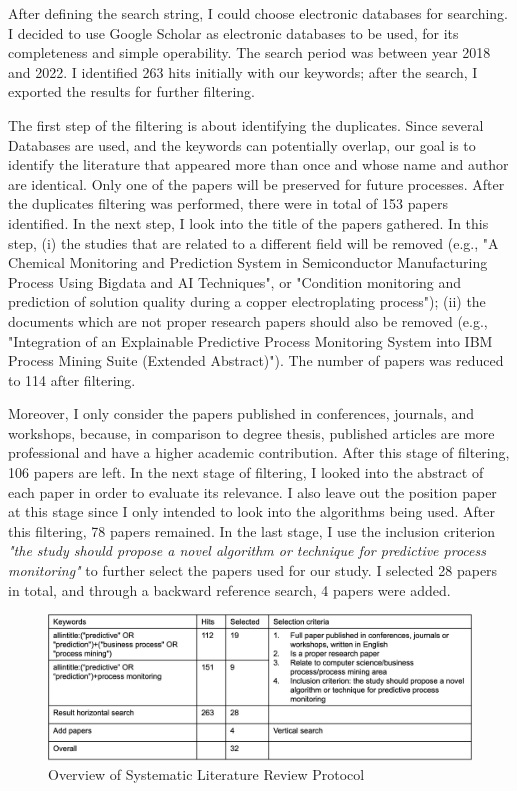 \documentclass[runningheads]{llncs}
\begin{document}
		After defining the search string, I could choose electronic databases for searching. I decided to use Google Scholar as electronic databases to be used, for its completeness and simple operability. The search period was between year 2018 and 2022. I identified 263 hits initially with our keywords; after the search, I exported the results for further filtering.
		
		The first step of the filtering is about identifying the duplicates. Since several Databases are used, and the keywords can potentially overlap, our goal is to identify the literature that appeared more than once and whose name and author are identical. Only one of the papers will be preserved for future processes. After the duplicates filtering was performed, there were in total of 153 papers identified. In the next step, I look into the title of the papers gathered. In this step, (i) the studies that are related to a different field will be removed (e.g., "A Chemical Monitoring and Prediction System in Semiconductor Manufacturing Process Using Bigdata and AI Techniques", or "Condition monitoring and prediction of solution quality during a copper electroplating process"); (ii) the documents which are not proper research papers should also be removed (e.g., "Integration of an Explainable Predictive Process Monitoring System into IBM Process Mining Suite (Extended Abstract)"). The number of papers was reduced to 114 after filtering.
		
		Moreover, I only consider the papers published in conferences, journals, and workshops, because, in comparison to degree thesis, published articles are more professional and have a higher academic contribution. After this stage of filtering, 106 papers are left. In the next stage of filtering, I looked into the abstract of each paper in order to evaluate its relevance. I also leave out the position paper at this stage since I only intended to look into the algorithms being used. After this filtering, 78 papers remained. In the last stage, I use the inclusion criterion \textit{"the study should propose a novel algorithm or technique for predictive process monitoring"} to further select the papers used for our study. I selected 28 papers in total, and through a backward reference search, 4 papers were added.
		
		\begin{figure}
		\includegraphics[width=\textwidth]{Filtering.png}
		\caption{Overview of Systematic Literature Review Protocol} \label{fig1}
		\end{figure}
		
\end{document}
